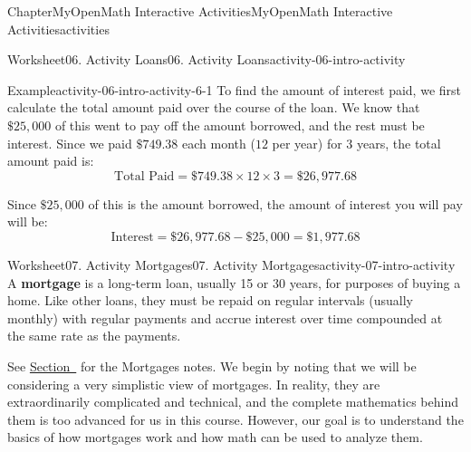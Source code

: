\documentclass[oneside,10pt,]{book}
\newcommand{\blocktitlefont}{\relax}
\newcommand{\ptxlistdisc}{\raisebox{0.3ex}{\textbullet}}
\newcommand{\terminology}[1]{\textbf{#1}}
\newlength{\fillinmaxwidth}
\newlength{\fillincontract}
\newlength{\charmaxwidth}\setlength{\charmaxwidth}{0.5em}
\newlength{\charminwidth}\setlength{\charminwidth}{0.1em}
\newlength{\fillinheight}
\newcommand{\fillintext}[1]{%
\setlength{\fillinmaxwidth}{#1\charmaxwidth}%
\setlength{\fillincontract}{#1\charminwidth}%
\setlength{\fillinheight}{\baselineskip}\addtolength{\fillinheight}{1.2pt}%
\strut\nobreak\leaders\vbox{\hrule width 0.3pt height 0.3pt \vskip -1.2pt}\hskip 1\fillinmaxwidth minus \fillincontract\nobreak\strut%
}
\begin{document}
\begin{chapterptx}{Chapter}{MyOpenMath Interactive Activities}{}{MyOpenMath Interactive Activities}{}{}{activities}
\begin{worksheet-section}{Worksheet}{06. Activity Loans}{}{06. Activity Loans}{}{}{activity-06-intro-activity}
\begin{example}{Example}{}{activity-06-intro-activity-6-1}
To find the amount of interest paid, we first calculate the total amount paid over the course of the loan. We know that \(\$25,000\) of this went to pay off the amount borrowed, and the rest must be interest. Since we paid \(\$749.38\) each month (\(12\) per year) for \(3\) years, the total amount paid is:%
\begin{equation*}
\text{Total Paid} = \$749.38 \times 12 \times 3 = \$26,977.68
\end{equation*}
%
\par
Since \(\$25,000\) of this is the amount borrowed, the amount of interest you will pay will be:%
\begin{equation*}
\text{Interest} = \$26,977.68 - \$25,000 = \$1,977.68
\end{equation*}
%
\end{example}
%
\end{worksheet-section}
\restoregeometry
%
%
\typeout{************************************************}
\typeout{************************************************}
%
\begin{worksheet-section}{Worksheet}{07. Activity Mortgages}{}{07. Activity Mortgages}{}{}{activity-07-intro-activity}
A \terminology{mortgage} is a long-term loan, usually 15 or 30 years, for purposes of buying a home. Like other loans, they must be repaid on regular intervals (usually monthly) with regular payments and accrue interest over time compounded at the same rate as the payments.%
 \par
See \hyperref[notes-Mortgages]{Section~} for the Mortgages notes.%
We begin by noting that we will be considering a very simplistic view of mortgages. In reality, they are extraordinarily complicated and technical, and the complete mathematics behind them is too advanced for us in this course. However, our goal is to understand the basics of how mortgages work and how math can be used to analyze them.%

\end{worksheet-section}
\end{chapterptx}
\end{document}
